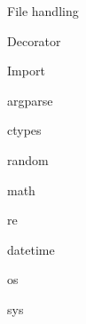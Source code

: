 \begin{multicols}{3}
    \begin{cschapter}{File handling}
        \csitem{}{}
    \end{cschapter}

    \begin{cschapter}{Decorator}
        \csitem{}{}
    \end{cschapter}

    \begin{cschapter}{Import}
        \csitem{}{}
    \end{cschapter}

    \begin{cschapter}{argparse}
        \csitem{}{}
    \end{cschapter}

    \begin{cschapter}{ctypes}
        \csitem{}{}
    \end{cschapter}

    \begin{cschapter}{random}
        \csitem{}{}
    \end{cschapter}

    \begin{cschapter}{math}
        \csitem{}{}
    \end{cschapter}

    \begin{cschapter}{re}
        \csitem{}{}
    \end{cschapter}

    \begin{cschapter}{datetime}
        \csitem{}{}
    \end{cschapter}

    \begin{cschapter}{os}
        \csitem{}{}
    \end{cschapter}

    \begin{cschapter}{sys}
        \csitem{}{}
    \end{cschapter}


\end{multicols}
